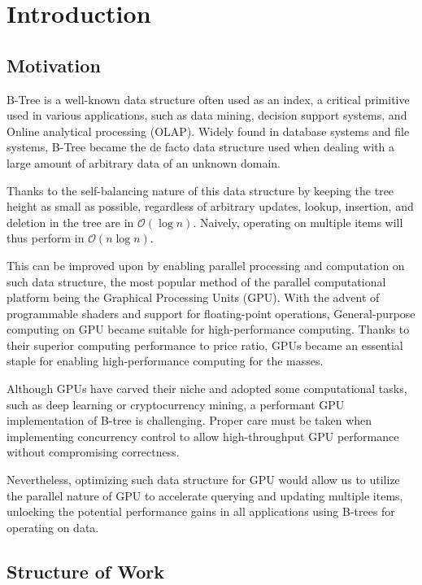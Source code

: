 \chapter{Introduction}

\section{Motivation}

B-Tree is a well-known data structure often used as an index, a critical primitive used in various applications, such as data mining, decision support systems, and Online analytical processing (OLAP). Widely found in database systems and file systems, B-Tree became the de facto data structure used when dealing with a large amount of arbitrary data of an unknown domain.

Thanks to the self-balancing nature of this data structure by keeping the tree height as small as possible, regardless of arbitrary updates, lookup, insertion, and deletion in the tree are in $\mathcal{O}(\log{n})$. Naively, operating on multiple items will thus perform in $\mathcal{O}(n \log{n})$.

This can be improved upon by enabling parallel processing and computation on such data structure, the most popular method of the parallel computational platform being the Graphical Processing Units (GPU). With the advent of programmable shaders and support for floating-point operations, General-purpose computing on GPU became suitable for high-performance computing. Thanks to their superior computing performance to price ratio, GPUs became an essential staple for enabling high-performance computing for the masses.

Although GPUs have carved their niche and adopted some computational tasks, such as deep learning or cryptocurrency mining, a performant GPU implementation of B-tree is challenging. Proper care must be taken when implementing concurrency control to allow high-throughput GPU performance without compromising correctness.

Nevertheless, optimizing such data structure for GPU would allow us to utilize the parallel nature of GPU to accelerate querying and updating multiple items, unlocking the potential performance gains in all applications using B-trees for operating on data.

\section{Structure of Work}


